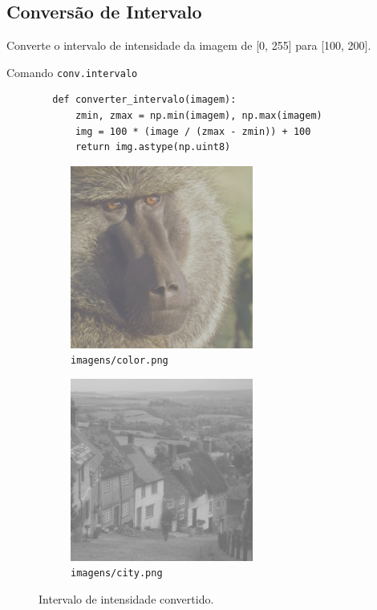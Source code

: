 \subsection{Conversão de Intervalo}

Converte o intervalo de intensidade da imagem de [0, 255] para [100, 200].

\begin{listing}[h]
    \caption{Comando \texttt{conv.intervalo}}

    \begin{verbatim}
        def converter_intervalo(imagem):
            zmin, zmax = np.min(imagem), np.max(imagem)
            img = 100 * (image / (zmax - zmin)) + 100
            return img.astype(np.uint8)
    \end{verbatim}
\end{listing}

\begin{figure}[!htb]
    \centering
    \begin{subfigure}{0.45\textwidth}
        \centering
        \includegraphics[width=6cm]{resultados/colorconv.png}
        \caption{\texttt{imagens/color.png}}
    \end{subfigure}%
    \begin{subfigure}{0.45\textwidth}
        \centering
        \includegraphics[width=6cm]{resultados/cityconv.png}
        \caption{\texttt{imagens/city.png}}
    \end{subfigure}

    \caption{Intervalo de intensidade convertido.}
\end{figure}
